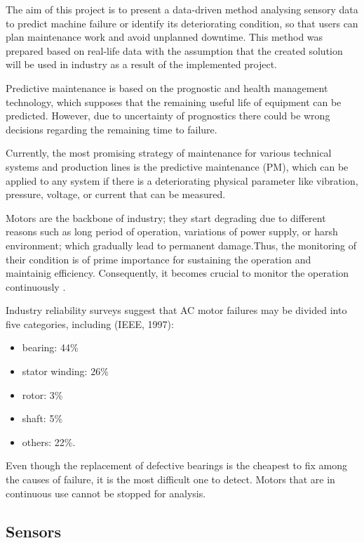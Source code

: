 The aim of this project is to present a data-driven method analysing sensory data to predict machine failure or identify its deteriorating condition, so that users can plan maintenance work and avoid unplanned downtime. This method was prepared based on real-life data with the assumption that the created solution will be used in industry as a result of the implemented project. 

Predictive maintenance is based on the prognostic and health management technology, which supposes that the remaining useful life of equipment can be predicted. However, due to uncertainty of prognostics there could be wrong decisions regarding the remaining time to failure. 

Currently, the most promising strategy of maintenance for various technical systems and production lines is the predictive maintenance (PM), which can be applied to any system if there is a deteriorating physical parameter like vibration, pressure, voltage, or current that can be measured\cite{sampaio_prediction_2019}.

 Motors are the backbone of industry; they start degrading due to different reasons such as long period of operation, variations of power supply, or harsh environment; which gradually lead to permanent damage.Thus, the monitoring of their condition is of prime importance for sustaining the operation and maintainig efficiency. Consequently, it becomes crucial to monitor the operation continuously \cite{han_motor_2019}. 

Industry reliability surveys suggest that AC motor failures may be divided into five categories, including (IEEE, 1997): 

\begin{itemize}
	\item bearing: 44\% 
	
	\item stator winding: 26\% 
	
	\item rotor: 3\% 
	
	\item shaft: 5\% 
	
	\item others: 22\%. 
\end{itemize}


Even though the replacement of defective bearings is the cheapest to fix among the causes of failure, it is the most difficult one to detect. Motors that are in continuous use cannot be stopped for analysis. 
\subsection{Sensors}
